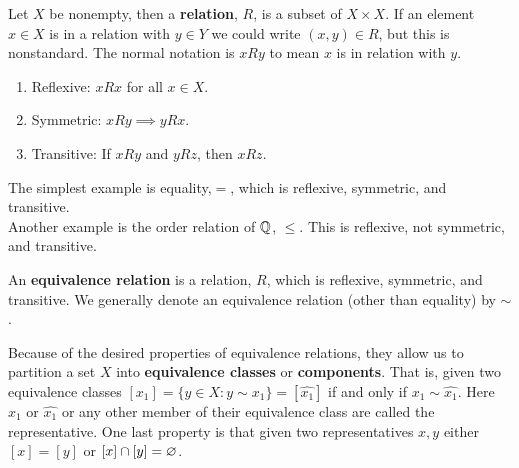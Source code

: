 \begin{definition}[Relation]
	Let \(X\) be nonempty, then a \textbf{relation}, \(R\), is a subset of \(X \times X\). If an element \(x \in X\) is in a relation with \(y \in Y\) we could write \(\left( x, y \right) \in R\), but this is nonstandard. The normal notation is \(xRy\) to mean \(x\) is in relation with \(y\).
\end{definition}
\begin{definition}
	\begin{enumerate}
		\item Reflexive: \(xRx\) for all \(x \in X\).
		\item Symmetric: \(xRy \implies yRx\).
		\item Transitive: If \(xRy\) and \(yRz\), then \(xRz\).
	\end{enumerate}
\end{definition}
\begin{example}
	The simplest example is equality,\(=\), which is reflexive, symmetric, and transitive.\\
	Another example is the order relation of \(\mathbb{Q}\), \(\le\). This is reflexive, not symmetric, and transitive.
\end{example}
\begin{definition}
	An \textbf{equivalence relation} is a relation, \(R\),  which is reflexive, symmetric, and transitive. We generally denote an equivalence relation (other than equality) by \(\sim\).
\end{definition}
\newpage
\begin{remark}
	Because of the desired properties of equivalence relations, they allow us to partition a set \(X\) into \textbf{equivalence classes} or \textbf{components}. That is, given two equivalence classes \(\left[ x_1 \right] = \{y \in X : y \sim x_1\}  = \left[ \hat{x_1} \right] \) if and only if \(x_1 \sim \hat{x_1}\). Here \(x_1\) or \(\hat{x_1}\) or any other member of their equivalence class are called the representative. One last property is that given two representatives \(x, y\) either \(\left[ x \right] = \left[ y \right] \) or \(\left[ x \right] \cap \left[ y \right] = \varnothing\).
\end{remark}
